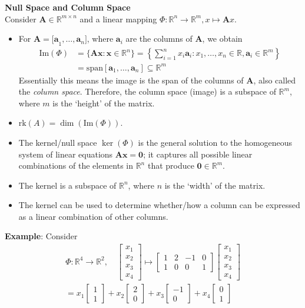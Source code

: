\documentclass{report}
\begin{document}
\newpage
\noindent\textbf{Null Space and Column Space}\\
Consider $\bm{A}\in\mathbb{R}^{m\times n}$ and a linear mapping 
$\Phi:\mathbb{R}^n\to\mathbb{R}^m,x\mapsto\bm{A}x$.
\begin{itemize}
\item For $\bm{A=[a}_1,\ldots,\bm{a}_n]$, where $\bm{a}_i$ are the columns of $\bm{A}$, we obtain
\begin{align*}
\text{Im}(\Phi)&=\{\bm{Ax}:\bm{x}\in\mathbb{R}^n\}
=\left\{\sum^n_{i=1}x_i\bm{a}_i:x_1,\ldots,x_n\in\mathbb{R},\bm{a}_i\in\mathbb{R}^m\right\}\\
&=\text{span}[\bm{a}_1,\ldots,\bm{a}_n]\subseteq\mathbb{R}^m
\end{align*}
Essentially this means the image is the span of the columns of $\bm{A}$, also called the
\textit{column space}. Therefore, the column space (image) is a subspace of $\mathbb{R}^m$, 
where $m$ is the `height' of the matrix.
\item$\text{rk}(A)=\dim(\text{Im}(\Phi))$.
\item The kernel/null space $\ker(\Phi)$ is the general solution to the homogeneous system of linear
equations $\bm{Ax}=\mathbf{0}$; it captures all possible linear combinations of the elements in $\mathbb{R}^n$
that produce $\bm{0}\in\mathbb{R}^m$.
\item The kernel is a subspace of $\mathbb{R}^n$, where $n$ is the `width' of the matrix. 
\item The kernel can be used to determine whether/how a column can be expressed as a linear combination
of other columns.
\end{itemize}
\textbf{Example}: Consider
\begin{align*}
\Phi:\mathbb{R}^4\to\mathbb{R}^2,\quad\begin{bmatrix*}
x_1\\x_2\\x_3\\x_4
\end{bmatrix*}\mapsto\begin{bmatrix*}
1&2&-1&0\\1&0&0&1
\end{bmatrix*}\begin{bmatrix*}
x_1\\x_2\\x_3\\x_4
\end{bmatrix*}\\
=x_1\begin{bmatrix}1\\1\end{bmatrix}
+x_2\begin{bmatrix}2\\0\end{bmatrix}
+x_3\begin{bmatrix}-1\\0\end{bmatrix}
+x_4\begin{bmatrix}0\\1\end{bmatrix}
\end{align*}
\end{document}
